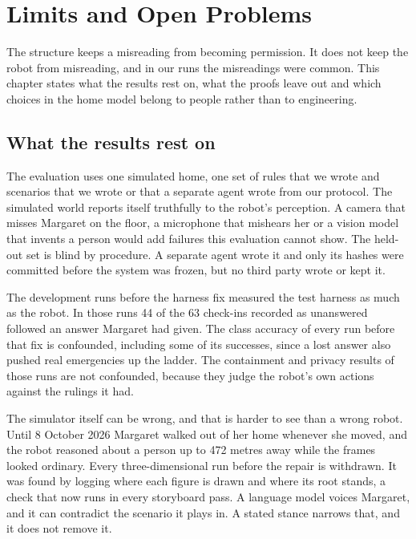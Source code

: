 \chapter{Limits and Open Problems}
\label{ch:limits}

The structure keeps a misreading from becoming permission. It does not keep the robot from
misreading, and in our runs the misreadings were common. This chapter states what the results rest
on, what the proofs leave out and which choices in the home model belong to people rather than to
engineering.

\section{What the results rest on}

The evaluation uses one simulated home, one set of rules that we wrote and scenarios that we wrote
or that a separate agent wrote from our protocol. The simulated world reports itself truthfully to
the robot's perception. A camera that misses Margaret on the floor, a microphone that mishears her
or a vision model that invents a person would add failures this evaluation cannot show. The
held-out set is blind by procedure. A separate agent wrote it and only its hashes were committed
before the system was frozen, but no third party wrote or kept it.

The development runs before the harness fix measured the test harness as much as the robot. In
those runs 44 of the 63 check-ins recorded as unanswered followed an answer Margaret had given. The
class accuracy of every run before that fix is confounded, including some of its successes, since a
lost answer also pushed real emergencies up the ladder. The containment and privacy results of
those runs are not confounded, because they judge the robot's own actions against the rulings it
had.

The simulator itself can be wrong, and that is harder to see than a wrong robot.
Until 8 October 2026 Margaret walked out of her home whenever she moved, and the robot reasoned
about a person up to 472 metres away while the frames looked ordinary.
Every three-dimensional run before the repair is withdrawn.
It was found by logging where each figure is drawn and where its root stands, a check that now runs
in every storyboard pass.
A language model voices Margaret, and it can contradict the scenario it plays in.
A stated stance narrows that, and it does not remove it.

